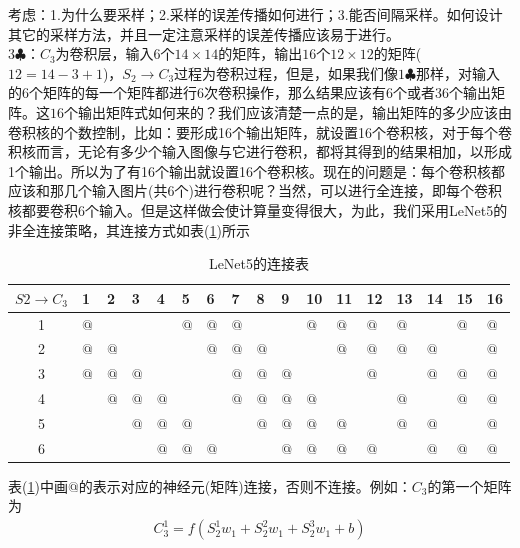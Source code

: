            \par
            考虑：1.为什么要采样；2.采样的误差传播如何进行；3.能否间隔采样。如何设计其它的采样方法，并且一定注意采样的误差传播应该易于进行。\\
            $3\clubsuit$：$C_3$为卷积层，输入6个$14\times 14$的矩阵，输出$16$个$12\times 12$的矩阵($12=14-3+1$)，$S_2\to C_3$过程为卷积过程，但是，如果我们像$1\clubsuit$那样，对输入的6个矩阵的每一个矩阵都进行6次卷积操作，那么结果应该有$6$个或者$36$个输出矩阵。这$16$个输出矩阵式如何来的？我们应该清楚一点的是，输出矩阵的多少应该由卷积核的个数控制，比如：要形成16个输出矩阵，就设置16个卷积核，对于每个卷积核而言，无论有多少个输入图像与它进行卷积，都将其得到的结果相加，以形成1个输出。所以为了有16个输出就设置16个卷积核。现在的问题是：每个卷积核都应该和那几个输入图片(共6个)进行卷积呢？当然，可以进行全连接，即每个卷积核都要卷积6个输入。但是这样做会使计算量变得很大，为此，我们采用LeNet5的非全连接策略，其连接方式如表(\ref{tab:LeNet5的连接表})所示
            \begin{table}[htbp]
              \caption{LeNet5的连接表}
              \label{tab:LeNet5的连接表}
              \centering
              \begin{tabular}{c|llllllllllllllll}
              \toprule
              $S2\to C_3$&1  &2 &3  &4  &5  &6  &7  &8  &9  &10 &11 &12 &13 &14 &15 &16 \\
              \midrule
              1          &$@$ &  &   &   &$@$ &$@$ &$@$ &   &   &$@$ &$@$ &$@$ &$@$ &   &$@$ &$@$\\
              2          &$@$ &$@$&   &   &   &$@$ &$@$ &$@$ &   &   &$@$ &$@$ &$@$ &$@$ &   &$@$\\
              3          &$@$ &$@$&$@$ &   &   &   &$@$ &$@$ &$@$ &   &   &$@$ &   &$@$ &$@$ &$@$\\
              4          &   &$@$&$@$ &$@$ &   &   &$@$ &$@$ &$@$ &$@$ &   &   &$@$ &   &$@$ &$@$\\
              5          &   &  &$@$ &$@$ &$@$ &   &   &$@$ &$@$ &$@$ &$@$ &   &$@$ &$@$ &   &$@$\\
              6          &   &  &   &$@$ &$@$ &$@$ &   &   &$@$ &$@$ &$@$ &$@$ &   &$@$ &$@$ &$@$\\
              \bottomrule
              \end{tabular}
            \end{table}
            表(\ref{tab:LeNet5的连接表})中画$@$的表示对应的神经元(矩阵)连接，否则不连接。例如：$C_3$的第一个矩阵为
            \begin{align*}
            C_3^1 = f(S_2^1 w_1 + S_2^2 w_1 + S_2^3 w_1 + b)
            \end{align*}
